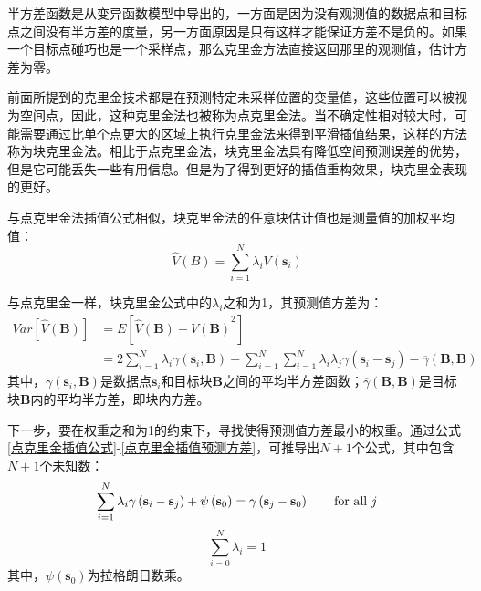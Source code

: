 半方差函数是从变异函数模型中导出的，一方面是因为没有观测值的数据点和目标点之间没有半方差的度量，另一方面原因是只有这样才能保证方差不是负的。如果一个目标点碰巧也是一个采样点，那么克里金方法直接返回那里的观测值，估计方差为零。

前面所提到的克里金技术都是在预测特定未采样位置的变量值，这些位置可以被视为空间点，因此，这种克里金法也被称为点克里金法。当不确定性相对较大时，可能需要通过比单个点更大的区域上执行克里金法来得到平滑插值结果，这样的方法称为块克里金法。相比于点克里金法，块克里金法具有降低空间预测误差的优势，但是它可能丢失一些有用信息。但是为了得到更好的插值重构效果，块克里金表现的更好。

与点克里金法插值公式相似，块克里金法的任意块估计值也是测量值的加权平均值：
\begin{equation}
    \hat{V}\left( B \right) = \sum_{i=1}^{N} \lambda_{i} V \left( \mathbf{s}_{i} \right)
    \label{块克里金插值公式}
\end{equation}

与点克里金一样，块克里金公式中的$ \lambda_{i} $之和为1，其预测值方差为：
\begin{equation}
    \begin{split}
        Var\left[ \hat{V} \left( \mathbf{B} \right) \right]
        & = E\left[ {\hat{V}\left( \mathbf{B} \right) - V\left( \mathbf{B} \right)}^{2} \right]     \\
        & = 2 \sum_{i=1}^{N} \lambda_{i} \gamma\left( \mathbf{s}_{i} , \mathbf{B} \right) - \sum_{i=1}^{N} \sum_{i=1}^{N} \lambda_{i} \lambda_{j} \gamma\left( \mathbf{s}_{i} - \mathbf{s}_{j} \right) - \overline{\gamma} \left( \mathbf{B}, \mathbf{B} \right)
    \end{split}
    \label{块克里金插值预测方差}
\end{equation}
其中，$ \gamma\left( \mathbf{s}_{i} , \mathbf{B} \right) $是数据点$ \mathbf{s}_{i} $和目标块$ \mathbf{B} $之间的平均半方差函数；$ \overline{\gamma} \left( \mathbf{B}, \mathbf{B} \right) $是目标块$ \mathbf{B} $内的平均半方差，即块内方差。

下一步，要在权重之和为1的约束下，寻找使得预测值方差最小的权重。通过公式\ref{点克里金插值公式}-\ref{点克里金插值预测方差}，可推导出$ N+1 $个公式，其中包含$ N+1 $个未知数：
\begin{equation}
    \sum_{i=1}^{N} \lambda_{i} \gamma \left( \mathbf{s}_{i} - \mathbf{s}_{j} \right) + \psi \left( \mathbf{s}_{0} \right) = \gamma \left( \mathbf{s}_{j} - \mathbf{s}_{0} \right) \qquad \text{for all $ j $}
    \label{点克里金法N个方程}
\end{equation}
\begin{equation}
    \sum_{i=0}^{N}\lambda_{i} = 1
    \label{点克里金法N+1个方程}
\end{equation}
其中，$ \psi \left( \mathbf{s}_{0} \right) $为拉格朗日数乘。

